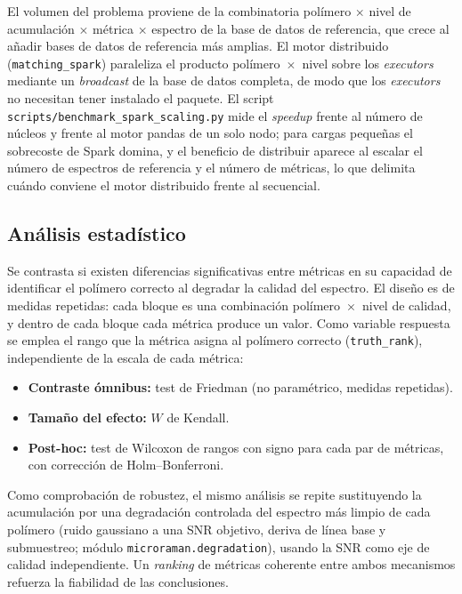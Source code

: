 El volumen del problema proviene de la combinatoria polímero $\times$ nivel de acumulación $\times$ métrica $\times$ espectro de la base de datos de referencia, que crece al añadir bases de datos de referencia más amplias. El motor distribuido (\texttt{matching\_spark}) paraleliza el producto polímero~$\times$~nivel sobre los \textit{executors} mediante un \textit{broadcast} de la base de datos completa, de modo que los \textit{executors} no necesitan tener instalado el paquete. El script \texttt{scripts/benchmark\_spark\_scaling.py} mide el \textit{speedup} frente al número de núcleos y frente al motor pandas de un solo nodo; para cargas pequeñas el sobrecoste de Spark domina, y el beneficio de distribuir aparece al escalar el número de espectros de referencia y el número de métricas, lo que delimita cuándo conviene el motor distribuido frente al secuencial.

\subsection{Análisis estadístico}

Se contrasta si existen diferencias significativas entre métricas en su capacidad de identificar el polímero correcto al degradar la calidad del espectro. El diseño es de medidas repetidas: cada bloque es una combinación polímero~$\times$~nivel de calidad, y dentro de cada bloque cada métrica produce un valor. Como variable respuesta se emplea el rango que la métrica asigna al polímero correcto (\texttt{truth\_rank}), independiente de la escala de cada métrica:

\begin{itemize}
    \item \textbf{Contraste ómnibus:} test de Friedman (no paramétrico, medidas repetidas).
    \item \textbf{Tamaño del efecto:} $W$ de Kendall.
    \item \textbf{Post-hoc:} test de Wilcoxon de rangos con signo para cada par de métricas, con corrección de Holm--Bonferroni.
\end{itemize}

Como comprobación de robustez, el mismo análisis se repite sustituyendo la acumulación por una degradación controlada del espectro más limpio de cada polímero (ruido gaussiano a una SNR objetivo, deriva de línea base y submuestreo; módulo \texttt{microraman.degradation}), usando la SNR como eje de calidad independiente. Un \textit{ranking} de métricas coherente entre ambos mecanismos refuerza la fiabilidad de las conclusiones.

